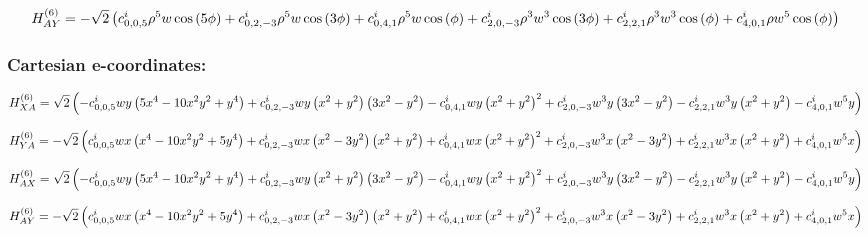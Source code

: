 \documentclass[fleqn]{article}
\begin{document}
\begin{dmath*}
H_{AY}^{(6)}=-  \sqrt{2} \left( c^{i}_{0,0,5} \rho^{5} w \cos{\left (5 \phi \right )} +  c^{i}_{0,2,-3} \rho^{5} w \cos{\left (3 \phi \right )} +  c^{i}_{0,4,1} \rho^{5} w \cos{\left (\phi \right )} +  c^{i}_{2,0,-3} \rho^{3} w^{3} \cos{\left (3 \phi \right )} +  c^{i}_{2,2,1} \rho^{3} w^{3} \cos{\left (\phi \right )} +  c^{i}_{4,0,1} \rho w^{5} \cos{\left (\phi \right )}\right)\\
\end{dmath*}
\subsubsection*{Cartesian e-coordinates:}

\begin{dmath*}
H_{XA}^{(6)}=\sqrt{2} \left(- c^{i}_{0,0,5} w y \left(5 x^{4} - 10 x^{2} y^{2} + y^{4}\right) + c^{i}_{0,2,-3} w y \left(x^{2} + y^{2}\right) \left(3 x^{2} - y^{2}\right) - c^{i}_{0,4,1} w y \left(x^{2} + y^{2}\right)^{2} + c^{i}_{2,0,-3} w^{3} y \left(3 x^{2} - y^{2}\right) - c^{i}_{2,2,1} w^{3} y \left(x^{2} + y^{2}\right) - c^{i}_{4,0,1} w^{5} y\right)\\
\end{dmath*}

\begin{dmath*}
H_{YA}^{(6)}=-  \sqrt{2} \left( c^{i}_{0,0,5} w x \left(x^{4} - 10 x^{2} y^{2} + 5 y^{4}\right) +  c^{i}_{0,2,-3} w x \left(x^{2} - 3 y^{2}\right) \left(x^{2} + y^{2}\right) +  c^{i}_{0,4,1} w x \left(x^{2} + y^{2}\right)^{2} +  c^{i}_{2,0,-3} w^{3} x \left(x^{2} - 3 y^{2}\right) +  c^{i}_{2,2,1} w^{3} x \left(x^{2} + y^{2}\right) +  c^{i}_{4,0,1} w^{5} x\right)\\
\end{dmath*}

\begin{dmath*}
H_{AX}^{(6)}=\sqrt{2} \left(- c^{i}_{0,0,5} w y \left(5 x^{4} - 10 x^{2} y^{2} + y^{4}\right) + c^{i}_{0,2,-3} w y \left(x^{2} + y^{2}\right) \left(3 x^{2} - y^{2}\right) - c^{i}_{0,4,1} w y \left(x^{2} + y^{2}\right)^{2} + c^{i}_{2,0,-3} w^{3} y \left(3 x^{2} - y^{2}\right) - c^{i}_{2,2,1} w^{3} y \left(x^{2} + y^{2}\right) - c^{i}_{4,0,1} w^{5} y\right)\\
\end{dmath*}

\begin{dmath*}
H_{AY}^{(6)}=-  \sqrt{2} \left( c^{i}_{0,0,5} w x \left(x^{4} - 10 x^{2} y^{2} + 5 y^{4}\right) +  c^{i}_{0,2,-3} w x \left(x^{2} - 3 y^{2}\right) \left(x^{2} + y^{2}\right) +  c^{i}_{0,4,1} w x \left(x^{2} + y^{2}\right)^{2} +  c^{i}_{2,0,-3} w^{3} x \left(x^{2} - 3 y^{2}\right) +  c^{i}_{2,2,1} w^{3} x \left(x^{2} + y^{2}\right) +  c^{i}_{4,0,1} w^{5} x\right)\\
\end{dmath*}
\end{document}
